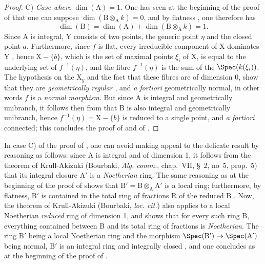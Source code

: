 \begin{proof}
C) \emph{Case where} $\dim(\mathrm{A})=1$.
One has seen at the beginning of the proof of  that one can suppose $\dim(\mathrm{B}\otimes_{\mathrm{A}}k)=0$, and by flatness , one therefore has
\[
  \dim(\mathrm{B})=\dim(\mathrm{A})+\dim(\mathrm{B}\otimes_{\mathrm{A}}k)=1.
\]
Since A is integral, Y consists of two points, the generic point $\eta$ and the closed point $a$.
Furthermore, since $f$ is flat, every irreducible component of X dominates Y , hence $\mathrm{X}-\{b\}$, which is the set of maximal points $\xi_i$ of X, is equal to
the underlying set of $f^{-1}(\eta)$, and the fibre $f^{-1}(\eta)$ is the sum of the $\Spec(k(\xi_i))$.
The hypothesis on the $\mathrm{X}_y$ and the fact that these fibres are of dimension 0, show that they are \emph{geometrically regular} , and \emph{a fortiori} geometrically normal, in other words $f$ is a \emph{normal morphism}.
But since A is integral and geometrically unibranch, it follows then from  that B is also integral and geometrically unibranch, hence $f^{-1}(\eta)=\mathrm{X}-\{b\}$ is reduced to a single point, and \emph{a fortiori} connected;
this concludes the proof of  and of .
\end{proof}

\begin{remark}[18.9.7.8]
\label{IV.18.9.7.8}
In case C) of the proof of , one can avoid making appeal to the delicate result  by reasoning as follows:
since A is integral and of dimension 1, it follows from the theorem of Krull-Akizuki (Bourbaki, \emph{Alg. comm.}, chap.~VII, \S~2, no~5, prop.~5) that its integral closure $\mathrm{A}'$ is a \emph{Noetherian} ring.
The same reasoning as at the beginning of the proof of  shows that $\mathrm{B}'=\mathrm{B}\otimes_{\mathrm{A}}\mathrm{A}'$ is a local ring;
furthermore, by flatness, $\mathrm{B}'$ is contained in the total ring of fractions R of the reduced $\mathrm{B}$ .
Now, the theorem of Krull-Akizuki (Bourbaki, \emph{loc. cit.}) also applies to a local Noetherian \emph{reduced} ring of dimension 1, and shows that for every such ring B, everything contained between B and its total ring of fractions is \emph{Noetherian}.
The ring $\mathrm{B}'$ being a local Noetherian ring and the morphism $\Spec(\mathrm{B}')\to\Spec(\mathrm{A}')$ being normal, $\mathrm{B}'$ is an integral ring and integrally closed , and one concludes as at the beginning of the proof of .
\end{remark}

